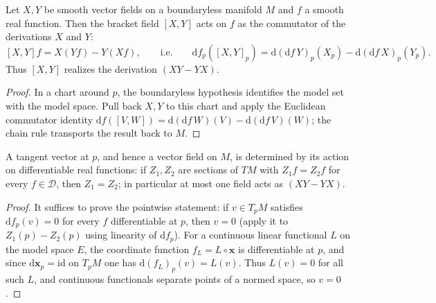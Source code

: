 \begin{lemma}
  \label{lem:dc-ch0-5-2-commutator}
  \leanok
  Let $X,Y$ be smooth vector fields on a boundaryless manifold $M$ and $f$ a smooth
  real function. Then the bracket field $[X,Y]$ acts on $f$ as the
  commutator of the derivations $X$ and $Y$:
  $$
  [X,Y]f = X(Yf)-Y(Xf), \qquad\text{i.e.}\qquad
  \mathrm{d}f_p([X,Y]_p) = \mathrm{d}(\mathrm{d}f\,Y)_p(X_p)-\mathrm{d}(\mathrm{d}f\,X)_p(Y_p).
  $$
  Thus $[X,Y]$ realizes the derivation $(XY-YX)$.
\end{lemma}
\begin{proof}
  \sketch
  \leanok
  In a chart around $p$, the boundaryless hypothesis identifies the model set with the
  model space. Pull back $X,Y$ to this chart and apply the Euclidean commutator identity
  $\mathrm{d}f([V,W])=\mathrm{d}(\mathrm{d}f\,W)(V)-\mathrm{d}(\mathrm{d}f\,V)(W)$;
  the chain rule transports the result back to $M$.
\end{proof}

\begin{lemma}
  \label{lem:dc-ch0-5-2-unique}
  \leanok
  A tangent vector at $p$, and hence a vector field on $M$, is determined by its
  action on differentiable real functions: if $Z_1,Z_2$ are sections of $TM$ with
  $Z_1f=Z_2f$ for every $f\in\mathcal{D}$, then $Z_1=Z_2$; in particular at most one
  field acts as $(XY-YX)$.
\end{lemma}
\begin{proof}
  \sketch
  \leanok
  It suffices to prove the pointwise statement: if $v\in T_pM$ satisfies
  $\mathrm{d}f_p(v)=0$ for every $f$ differentiable at $p$, then $v=0$
  (apply it to $Z_1(p)-Z_2(p)$ using linearity of $\mathrm{d}f_p$). For a
  continuous linear functional $L$ on the model space $E$, the coordinate function
  $f_L=L\circ\mathbf{x}$
  is differentiable at $p$, and since $\mathrm{d}\mathbf{x}_p=\mathrm{id}$ on
  $T_pM$ one has $\mathrm{d}(f_L)_p(v)=L(v)$. Thus $L(v)=0$ for all such $L$, and
  continuous functionals separate points of a normed space, so $v=0$.
\end{proof}

